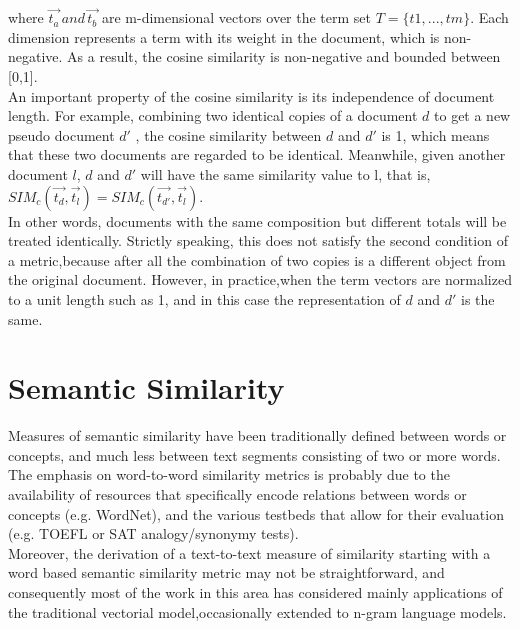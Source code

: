 where $\overrightarrow{t_{a}} \,and\, \overrightarrow{t_{b}}$ are m-dimensional vectors over the term set $T = \{t1 , . . . , tm \}$. Each dimension represents a term with its weight in the document, which is non-negative. As a result, the cosine similarity is non-negative and bounded between [0,1].\\
An important property of the cosine similarity is its independence of document length. For example, combining two identical copies of a document $d$ to get a new pseudo document $d'$ , the cosine similarity between $d$ and $d'$ is 1, which means that these two documents are regarded to be identical. Meanwhile, given another document $l$, $d$ and $d'$ will have the same similarity value to l, that is, 
$SIM_{c}(\vec{t_{d}},\vec{t_{l}})= SIM_{c}(\vec{t_{d'}},\vec{t_{l}})$.\\ 
In other words, documents with the same composition but different totals will be treated identically. Strictly speaking, this does not satisfy the second condition of a metric,because after all the combination of two copies is a different object from the original document. However, in practice,when the term vectors are normalized to a unit length such as 1, and in this case the representation of $d$ and $d'$ is the same.


\section{Semantic Similarity}
\label {semanticSim}
Measures of semantic similarity have been traditionally defined between words or concepts, and much less between text segments consisting of two or more words. The emphasis on word-to-word similarity metrics is probably due to the availability of resources that specifically encode relations between words or concepts (e.g. WordNet), and the various testbeds that allow for their evaluation (e.g. TOEFL or SAT analogy/synonymy tests). \\
Moreover, the derivation of a text-to-text measure of similarity starting with a word based semantic similarity metric may not be straightforward, and consequently most of the work in this area has considered mainly applications of the traditional vectorial model,occasionally extended to n-gram language models\citep{semantic}.\\

